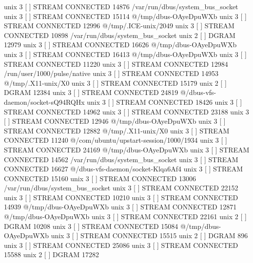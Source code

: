 unix  3      [ ]         STREAM     CONNECTED     14876    /var/run/dbus/system_bus_socket
unix  3      [ ]         STREAM     CONNECTED     15114    @/tmp/dbus-OAyeDpuWXb
unix  3      [ ]         STREAM     CONNECTED     12996    @/tmp/.ICE-unix/2049
unix  3      [ ]         STREAM     CONNECTED     10898    /var/run/dbus/system_bus_socket
unix  2      [ ]         DGRAM                    12979    
unix  3      [ ]         STREAM     CONNECTED     16626    @/tmp/dbus-OAyeDpuWXb
unix  3      [ ]         STREAM     CONNECTED     16413    @/tmp/dbus-OAyeDpuWXb
unix  3      [ ]         STREAM     CONNECTED     11220    
unix  3      [ ]         STREAM     CONNECTED     12984    /run/user/1000/pulse/native
unix  3      [ ]         STREAM     CONNECTED     14953    @/tmp/.X11-unix/X0
unix  3      [ ]         STREAM     CONNECTED     15179    
unix  2      [ ]         DGRAM                    12384    
unix  3      [ ]         STREAM     CONNECTED     24819    @/dbus-vfs-daemon/socket-sQ94RQHx
unix  3      [ ]         STREAM     CONNECTED     18426    
unix  3      [ ]         STREAM     CONNECTED     14962    
unix  3      [ ]         STREAM     CONNECTED     23188    
unix  3      [ ]         STREAM     CONNECTED     12946    @/tmp/dbus-OAyeDpuWXb
unix  3      [ ]         STREAM     CONNECTED     12882    @/tmp/.X11-unix/X0
unix  3      [ ]         STREAM     CONNECTED     11240    @/com/ubuntu/upstart-session/1000/1934
unix  3      [ ]         STREAM     CONNECTED     24169    @/tmp/dbus-OAyeDpuWXb
unix  3      [ ]         STREAM     CONNECTED     14562    /var/run/dbus/system_bus_socket
unix  3      [ ]         STREAM     CONNECTED     16627    @/dbus-vfs-daemon/socket-Klqa6Af4
unix  3      [ ]         STREAM     CONNECTED     15160    
unix  3      [ ]         STREAM     CONNECTED     13006    /var/run/dbus/system_bus_socket
unix  3      [ ]         STREAM     CONNECTED     22152    
unix  3      [ ]         STREAM     CONNECTED     10210    
unix  3      [ ]         STREAM     CONNECTED     14939    @/tmp/dbus-OAyeDpuWXb
unix  3      [ ]         STREAM     CONNECTED     12871    @/tmp/dbus-OAyeDpuWXb
unix  3      [ ]         STREAM     CONNECTED     22161    
unix  2      [ ]         DGRAM                    10208    
unix  3      [ ]         STREAM     CONNECTED     15084    @/tmp/dbus-OAyeDpuWXb
unix  3      [ ]         STREAM     CONNECTED     15515    
unix  2      [ ]         DGRAM                    896      
unix  3      [ ]         STREAM     CONNECTED     25086    
unix  3      [ ]         STREAM     CONNECTED     15588    
unix  2      [ ]         DGRAM                    17282    
